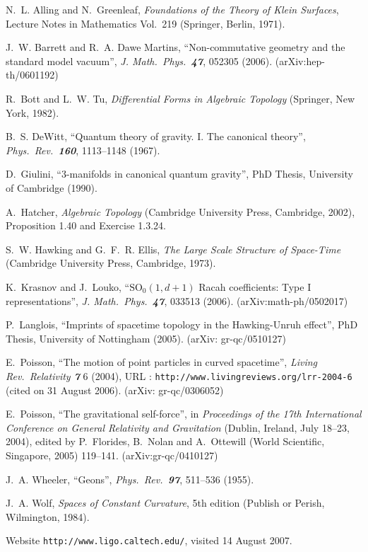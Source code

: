 \documentclass{uonmathreport}
\begin{document}
\begin{thebibliography}{99} %

N.~L. Alling and N.~Greenleaf,
{\it Foundations of the Theory of Klein Surfaces\/},
Lecture Notes in Mathematics Vol.~219
(Springer, Berlin, 1971).

J.~W. Barrett and R.~A. Dawe Martins,
``Non-commutative geometry and the standard model vacuum'',
{\it J. Math.\ Phys.\ \bf 47}, 052305 (2006).
(arXiv:hep-th/0601192)

R.~Bott and L.~W. Tu,
{\it Differential Forms in Algebraic Topology\/}
(Springer, New York, 1982).

B.~S. DeWitt,
``Quantum theory of gravity. I. The canonical theory'',
{\it Phys.\ Rev.\ \bf 160}, 1113--1148
(1967).

D.~Giulini,
``3-manifolds in canonical quantum gravity'',
PhD Thesis,
University of Cambridge (1990).

A.~Hatcher,
{\it Algebraic Topology\/}
(Cambridge University Press, Cambridge, 2002),
Proposition 1.40 and Exercise 1.3.24.

S.~W. Hawking and G.~F.~R. Ellis,
{\it The Large Scale Structure of Space-Time\/}
(Cambridge University Press, Cambridge, 1973).

K.~Krasnov and J.~Louko,
``$\mathrm{SO}_0(1,d+1)$ Racah coefficients: Type I representations'',
{\it J. Math.\ Phys.\ \bf 47}, 033513 (2006).
(arXiv:math-ph/0502017)

P.~Langlois,
``Imprints of spacetime topology in the Hawking-Unruh effect'',
PhD Thesis, University of Nottingham (2005).
(arXiv: gr-qc/0510127)

E.~Poisson,
``The motion of point particles in curved spacetime'',
{\it Living Rev.\ Relativity \bf 7} 6 (2004),
URL : \texttt{http://www.livingreviews.org/lrr-2004-6} (cited on 31 August 2006).
(arXiv: gr-qc/0306052)

E.~Poisson,
``The gravitational self-force'',
in
{\it Proceedings of the
17th International Conference on General
Relativity and Gravitation\/} (Dublin, Ireland, July 18--23, 2004),
edited by
P.~Florides, B.~Nolan and A.~Ottewill
(World Scientific, Singapore, 2005) 119--141.
(arXiv:gr-qc/0410127)

J.~A. Wheeler,
``Geons'',
{\it Phys.\ Rev.\ \bf 97}, 511--536
(1955).

J.~A. Wolf,
{\it Spaces of Constant Curvature\/},
5th edition
(Publish or Perish, Wilmington, 1984).


Website \texttt{http://www.ligo.caltech.edu/},
visited 14 August 2007.

\end{thebibliography}
\end{document}
